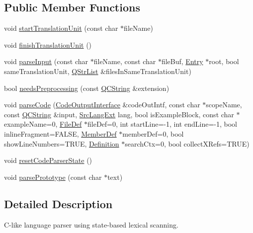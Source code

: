 \subsection*{Public Member Functions}
\begin{DoxyCompactItemize}
\item 
void \mbox{\hyperlink{class_c_language_scanner_a8b667ac29ed52d3374f0df39a63d4c73}{start\+Translation\+Unit}} (const char $\ast$file\+Name)
\item 
void \mbox{\hyperlink{class_c_language_scanner_a03f5004bda27f5c73f3b9d74d9064b99}{finish\+Translation\+Unit}} ()
\item 
void \mbox{\hyperlink{class_c_language_scanner_a0a92c2f77d7b78987e8dad149a2f4171}{parse\+Input}} (const char $\ast$file\+Name, const char $\ast$file\+Buf, \mbox{\hyperlink{class_entry}{Entry}} $\ast$root, bool same\+Translation\+Unit, \mbox{\hyperlink{class_q_str_list}{Q\+Str\+List}} \&files\+In\+Same\+Translation\+Unit)
\item 
bool \mbox{\hyperlink{class_c_language_scanner_a88315d1d6591098e284bd2b91d4ba233}{needs\+Preprocessing}} (const \mbox{\hyperlink{class_q_c_string}{Q\+C\+String}} \&extension)
\item 
void \mbox{\hyperlink{class_c_language_scanner_a1d8d53789892f16d48fc90878d825f76}{parse\+Code}} (\mbox{\hyperlink{class_code_output_interface}{Code\+Output\+Interface}} \&code\+Out\+Intf, const char $\ast$scope\+Name, const \mbox{\hyperlink{class_q_c_string}{Q\+C\+String}} \&input, \mbox{\hyperlink{types_8h_a9974623ce72fc23df5d64426b9178bf2}{Src\+Lang\+Ext}} lang, bool is\+Example\+Block, const char $\ast$example\+Name=0, \mbox{\hyperlink{class_file_def}{File\+Def}} $\ast$file\+Def=0, int start\+Line=-\/1, int end\+Line=-\/1, bool inline\+Fragment=F\+A\+L\+SE, \mbox{\hyperlink{class_member_def}{Member\+Def}} $\ast$member\+Def=0, bool show\+Line\+Numbers=T\+R\+UE, \mbox{\hyperlink{class_definition}{Definition}} $\ast$search\+Ctx=0, bool collect\+X\+Refs=T\+R\+UE)
\item 
void \mbox{\hyperlink{class_c_language_scanner_a2d569ccde3f87597741b3cde8efb3af5}{reset\+Code\+Parser\+State}} ()
\item 
void \mbox{\hyperlink{class_c_language_scanner_afabfbfe6ca101e1d0d02fed9d197cad1}{parse\+Prototype}} (const char $\ast$text)
\end{DoxyCompactItemize}


\subsection{Detailed Description}
C-\/like language parser using state-\/based lexical scanning. 

